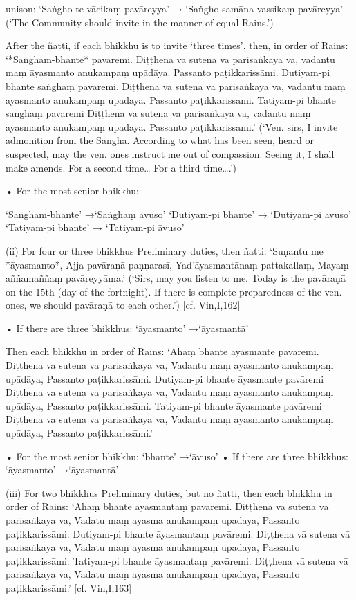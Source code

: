 unison:
‘Saṅgho te-vācikaṃ pavāreyya’
→ ‘Saṅgho samāna-vassikaṃ pavāreyya’
(‘The Community should invite
in the manner of equal Rains.’)

After the ñatti, if each bhikkhu is to invite
‘three times’, then, in order of Rains:
‘*Saṅgham-bhante* pavāremi.
Diṭṭhena vā sutena vā parisaṅkāya vā,
vadantu maṃ āyasmanto anukampaṃ upādāya.
Passanto paṭikkarissāmi.
Dutiyam-pi bhante saṅghaṃ pavāremi.
Diṭṭhena vā sutena vā parisaṅkāya vā,
vadantu maṃ āyasmanto anukampaṃ upādāya.
Passanto paṭikkarissāmi.
Tatiyam-pi bhante saṅghaṃ pavāremi
Diṭṭhena vā sutena vā parisaṅkāya vā,
vadantu maṃ āyasmanto anukampaṃ upādāya.
Passanto paṭikkarissāmi.’
(‘Ven. sirs, I invite admonition from the Sangha.
According to what has been seen, heard or suspected,
may the ven. ones instruct me out of compassion.
Seeing it, I shall make amends.
For a second time… For a third time….’)

• For the most senior bhikkhu:

‘Saṅgham-bhante’ →‘Saṅghaṃ āvuso’
‘Dutiyam-pi bhante’ → ‘Dutiyam-pi āvuso’
‘Tatiyam-pi bhante’ → ‘Tatiyam-pi āvuso’

(ii) For four or three bhikkhus
Preliminary duties, then ñatti:
‘Suṇantu me *āyasmanto*,
Ajja pavāraṇā paṇṇarasī,
Yad'āyasmantānaṃ pattakallaṃ,
Mayaṃ aññamaññaṃ pavāreyyāma.’
(‘Sirs, may you listen to me. Today is the pavāraṇā
on the 15th (day of the fortnight). If there is
complete preparedness of the ven. ones, we should
pavāraṇā to each other.’)
[cf. Vin,I,162]

• If there are three bhikkhus:
‘āyasmanto’ →‘āyasmantā’

Then each bhikkhu in order of Rains:
‘Ahaṃ bhante āyasmante pavāremi.
Diṭṭhena vā sutena vā parisaṅkāya vā,
Vadantu maṃ āyasmanto anukampaṃ upādāya,
Passanto paṭikkarissāmi.
Dutiyam-pi bhante āyasmante pavāremi
Diṭṭhena vā sutena vā parisaṅkāya vā,
Vadantu maṃ āyasmanto anukampaṃ upādāya,
Passanto paṭikkarissāmi.
Tatiyam-pi bhante āyasmante pavāremi
Diṭṭhena vā sutena vā parisaṅkāya vā,
Vadantu maṃ āyasmanto anukampaṃ upādāya,
Passanto paṭikkarissāmi.’

• For the most senior bhikkhu:
‘bhante’ →‘āvuso’
• If there are three bhikkhus:
‘āyasmanto’ →‘āyasmantā’

(iii) For two bhikkhus
Preliminary duties, but no ñatti, then each
bhikkhu in order of Rains:
‘Ahaṃ bhante āyasmantaṃ pavāremi.
Diṭṭhena vā sutena vā parisaṅkāya vā,
Vadatu maṃ āyasmā anukampaṃ upādāya,
Passanto paṭikkarissāmi.
Dutiyam-pi bhante āyasmantaṃ pavāremi.
Diṭṭhena vā sutena vā parisaṅkāya vā,
Vadatu maṃ āyasmā anukampaṃ upādāya,
Passanto paṭikkarissāmi.
Tatiyam-pi bhante āyasmantaṃ pavāremi.
Diṭṭhena vā sutena vā parisaṅkāya vā,
Vadatu maṃ āyasmā anukampaṃ upādāya,
Passanto paṭikkarissāmi.’
[cf. Vin,I,163]

